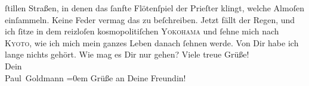 \begin{ledgroupsized}[t]{13cm}
               ſtillen Straßen, in denen das ſanfte Flötenſpiel der Prieſter klingt, welche Almoſen
               einſammeln. Keine Feder vermag das zu beſchreiben. Jetzt fällt der Regen, und ich
               ſitze in dem reizloſen kosmopolitiſchen \textsc{Yokohama} und ſehne mich nach \textsc{Kyoto}, wie ich mich mein ganzes Leben danach ſehnen werde.\pend
           \pstart
           Von Dir habe ich lange nichts gehört. Wie mag es Dir nur gehen?\pend
           \pstart
           Viele treue Grüße! {\\[\baselineskip]}Dein {\\[\baselineskip]}\spacefill\mbox{Paul Goldmann}\pend
           \leftskip=0em{}\pstart
           \noindent{}Grüße an Deine Freundin!\pend
           
         
         \endnumbering{}\end{ledgroupsized}  \newcommand{\dateiname}{L02864}\newcommand{\titel}{Paul Goldmann an Arthur Schnitzler, 3. 11. [1898]}\newcommand{\editorInnen}{Martin Anton Müller und Laura Untner}
      